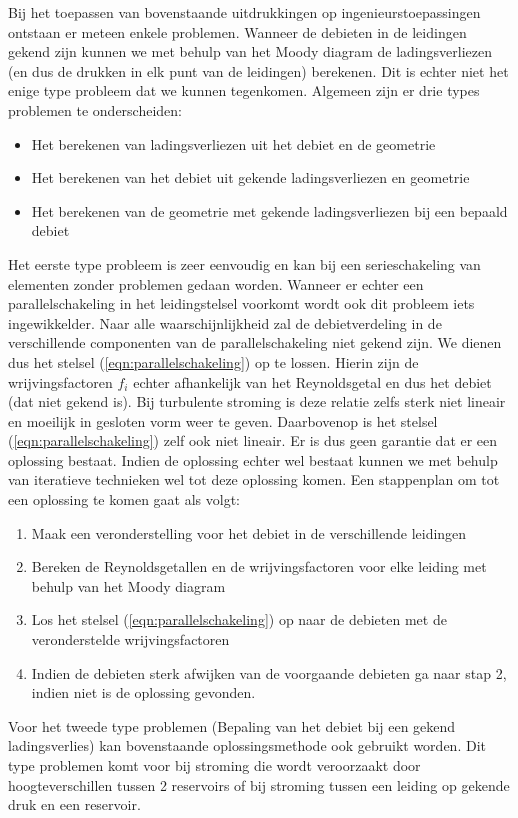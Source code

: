 Bij het toepassen van bovenstaande uitdrukkingen op ingenieurstoepassingen ontstaan er meteen enkele problemen. Wanneer de debieten in de leidingen gekend zijn kunnen we met behulp van het Moody diagram de ladingsverliezen (en dus de drukken in elk punt van de leidingen) berekenen. Dit is echter niet het enige type probleem dat we kunnen tegenkomen. Algemeen zijn er drie types problemen te onderscheiden:
\begin{itemize}
	\item Het berekenen van ladingsverliezen uit het debiet en de geometrie
	\item Het berekenen van het debiet uit gekende ladingsverliezen en geometrie
	\item Het berekenen van de geometrie met gekende ladingsverliezen bij een bepaald debiet
\end{itemize}
Het eerste type probleem is zeer eenvoudig en kan bij een serieschakeling van elementen zonder problemen gedaan worden. Wanneer er echter een parallelschakeling in het leidingstelsel voorkomt wordt ook dit probleem iets ingewikkelder. Naar alle waarschijnlijkheid zal de debietverdeling in de verschillende componenten van de parallelschakeling niet gekend zijn. We dienen dus het stelsel (\ref{eqn:parallelschakeling}) op te lossen. Hierin zijn de wrijvingsfactoren $f_i$ echter afhankelijk van het Reynoldsgetal en dus het debiet (dat niet gekend is). Bij turbulente stroming is deze relatie zelfs sterk niet lineair en moeilijk in gesloten vorm weer te geven. Daarbovenop is het stelsel (\ref{eqn:parallelschakeling}) zelf ook niet lineair. Er is dus geen garantie dat er een oplossing bestaat.
Indien de oplossing echter wel bestaat kunnen we met behulp van iteratieve technieken wel tot deze oplossing komen. Een stappenplan om tot een oplossing te komen gaat als volgt:
\begin{enumerate}
	\item Maak een veronderstelling voor het debiet in de verschillende leidingen
	\item Bereken de Reynoldsgetallen en de wrijvingsfactoren voor elke leiding met behulp van het Moody diagram
	\item Los het stelsel (\ref{eqn:parallelschakeling}) op naar de debieten met de veronderstelde wrijvingsfactoren
	\item Indien de debieten sterk afwijken van de voorgaande debieten ga naar stap 2, indien niet is de oplossing gevonden.
\end{enumerate}

Voor het tweede type problemen (Bepaling van het debiet bij een gekend ladingsverlies) kan bovenstaande oplossingsmethode ook gebruikt worden. Dit type problemen komt voor bij stroming die wordt veroorzaakt door hoogteverschillen tussen 2 reservoirs of bij stroming tussen een leiding op gekende druk en een reservoir. 

